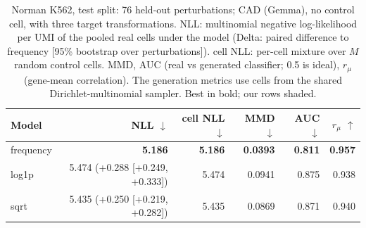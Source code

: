 \begin{table}[htbp]
\centering
\small
\setlength{\tabcolsep}{4pt}
\begin{tabular}{lrrrrr}
\toprule
Model & NLL $\downarrow$ & cell NLL $\downarrow$ & MMD $\downarrow$ & AUC $\downarrow$ & $r_\mu$ $\uparrow$ \\
\midrule
\rowcolor{ours}frequency & \textbf{5.186} & \textbf{5.186} & \textbf{0.0393} & \textbf{0.811} & \textbf{0.957} \\
log1p & 5.474 (+0.288 [+0.249, +0.333]) & 5.474 & 0.0941 & 0.875 & 0.938 \\
sqrt & 5.435 (+0.250 [+0.219, +0.282]) & 5.435 & 0.0869 & 0.871 & 0.940 \\
\bottomrule
\end{tabular}
\caption{Norman K562, test split: 76 held-out perturbations; CAD (Gemma), no control cell, with three target transformations. NLL: multinomial negative log-likelihood per UMI of the pooled real cells under the model (Delta: paired difference to frequency [95\% bootstrap over perturbations]). cell NLL: per-cell mixture over $M$ random control cells. MMD, AUC (real vs generated classifier; 0.5 is ideal), $r_\mu$ (gene-mean correlation). The generation metrics use cells from the shared Dirichlet-multinomial sampler. Best in bold; our rows shaded.}
\label{tab:norman_test_transform}
\end{table}